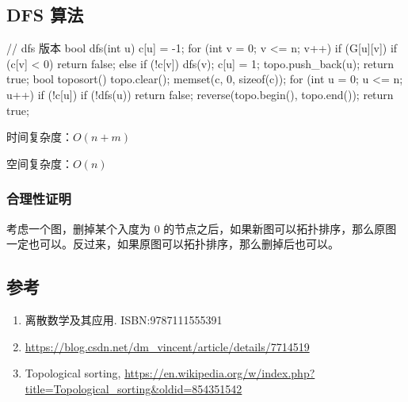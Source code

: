 \subsection{DFS 算法}

\begin{cppcode}
// dfs 版本
bool dfs(int u) {
  c[u] = -1;
  for (int v = 0; v <= n; v++)
    if (G[u][v]) {
      if (c[v] < 0)
        return false;
      else if (!c[v])
        dfs(v);
    }
  c[u] = 1;
  topo.push_back(u);
  return true;
}
bool toposort() {
  topo.clear();
  memset(c, 0, sizeof(c));
  for (int u = 0; u <= n; u++)
    if (!c[u])
      if (!dfs(u)) return false;
  reverse(topo.begin(), topo.end());
  return true;
}
\end{cppcode}

时间复杂度：$O(n+m)$

空间复杂度：$O(n)$

\subsubsection{合理性证明}

考虑一个图，删掉某个入度为 0 的节点之后，如果新图可以拓扑排序，那么原图一定也可以。反过来，如果原图可以拓扑排序，那么删掉后也可以。

\subsection{参考}

\begin{enumerate}
\item 离散数学及其应用. ISBN:9787111555391
\item \url{https://blog.csdn.net/dm_vincent/article/details/7714519}
\item Topological sorting, \url{https://en.wikipedia.org/w/index.php?title=Topological_sorting&oldid=854351542}
\end{enumerate}
